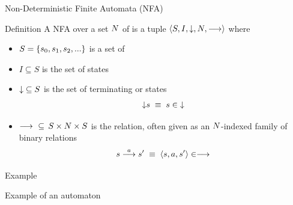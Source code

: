 \documentclass[aspectratio=169]{beamer}
\begin{document}
\begin{slide}{Non-Deterministic Finite Automata (NFA)}
\small
\begin{block}{Definition}
A NFA over a set $N$ of  is a tuple
$\mathopen{\langle}S, I, \downarrow, N,  \longrightarrow\mathclose{\rangle}$ where
\begin{itemize}
\item $S = \mathopen{ \{ }s_0, s_1, s_2, ...\mathclose{ \} }$ is a set of 
\item $I \subseteq S$ is the set of  states
\item  ${{\downarrow}} \subseteq S$ is the set of {terminating} or  states
\begin{equation*}
{\downarrow} s \; \equiv\; s \in {\downarrow}
\end{equation*}
\item  ${\longrightarrow} \,\,\subseteq\, S \times N \times S$ is the  relation, often given as an $N$-indexed family of binary relations 
\begin{equation*}
s \stackrel{a}{\longrightarrow} s'\; \equiv\; \mathopen{\langle}s,a,s'\mathclose{\rangle} \in \longrightarrow
\end{equation*}
\end{itemize}
\end{block}
\end{slide}


\begin{slide}{Example}
  \begin{block}{Example of an automaton}
  \centering
  ~~~~
  \end{block}
  ~\\[-3mm]
  \begin{block}{}
      \\[0.30\textheight]
  \end{block}

\end{slide}
\end{document}
